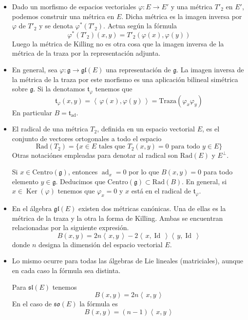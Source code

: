 \documentclass[a4paper,draft,12pt]{article}
\newcommand{\g}{\mathfrak{g}}%
\newcommand{\escalar}[2]{\left\langle\, #1,#2\, \right\rangle}  %
\newcommand{\df}[1]{\textsf{\color{blue}#1}}
\DeclareMathOperator{\Ker}{Ker}%
\DeclareMathOperator{\Id}{Id}%
\DeclareMathOperator{\ad}{ad}  %
\begin{document}
\begin{itemize}

\item Dado un morfismo de espacios vectoriales $\varphi : E \rightarrow E'$ y una métrica $T'_2$ en $E'$, podemos construir una métrica en $E$. Dicha métrica es la imagen inversa por $\varphi$ de  $T'_2$ y se denota $\varphi^*(T'_2)$.  Actua según la fórmula
$$
\varphi^*(T'_2)(x,y) = T'_2(\varphi(x),\varphi(y))
$$
Luego la métrica de Killing no es otra cosa que la imagen inversa de la métrica de la traza por la representación adjunta.


\item En general, sea $\varphi:\g \rightarrow \mathfrak{gl}(E)$ una representación de $\g$.  La imagen inversa de la métrica de la traza por este morfismo es una aplicación bilineal simétrica sobre $\g$.  Si la denotamos $\mathfrak{t}_\varphi$ tenemos que
$$
\mathfrak{t}_\varphi (x,y) = \escalar{\varphi(x)}{\varphi(y)}= \mathrm{Traza}(\varphi_x\varphi_y)
$$
En particular $B= \mathfrak{t}_{\ad}$.

\item El  \df{radical}  de una métrica $T_2$,  definida en un espacio vectorial $E$, es el conjunto de vectores ortogonales a todo el espacio
$$
\mathrm{Rad}(T_2)= \{ x \in E \text{ tales que } T_2(x,y)=0 \text{ para todo } y \in E\}
$$
Otras notaciónes  empleadas para denotar al radical son $\mathrm{Rad}(E)$ y   $E^\perp$.

Si $x \in \mathrm{Centro}(\g)$, entonces $\ad_x=0$ por lo que $B(x,y)=0$ para todo elemento $y \in \g$.  Deducimos que $\mathrm{Centro}(\g) \subset \mathrm{Rad}(B)$.  En general, si $ x \in \Ker (\varphi)$ tenemos que $\varphi_x=0$ y $x$ está en el radical de $\mathfrak{t}_\varphi$. 

\item  En el álgebra $\mathfrak{gl}(E)$ existen dos métricas canónicas.  Una de ellas es la métrica de la traza y la otra la forma de Killing.  Ambas se encuentran relacionadas por la siguiente expresión.
$$
B(x,y) = 2n \escalar{x}{y}-2\escalar{x}{\Id}\escalar{y}{\Id}
$$
donde $n$ designa la dimensión del espacio vectorial $E$.

\item Lo mismo ocurre para todas las álgebras de Lie lineales (matriciales), aunque en cada caso la fórmula sea distinta.

Para $\mathfrak{sl}(E)$ tenemos
$$
B(x,y) = 2n \escalar{x}{y}
$$
En el caso de $\mathfrak{so}(E)$ la fórmula es 
$$
B(x,y) = (n-1) \escalar{x}{y}
$$



\end{itemize}
\end{document}
